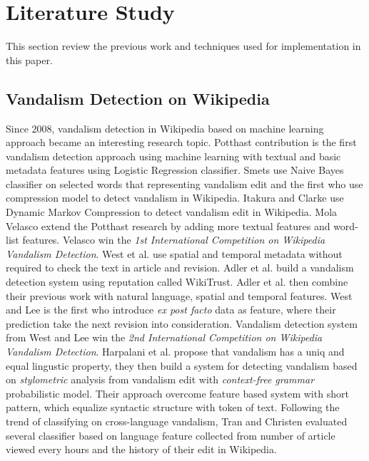 \documentclass[conference,compsoc,a4paper,twocolumn,final]{IEEEtran}
\begin{document}

\section{Literature Study}
\label{section:literature_study}

This section review the previous work and techniques used for implementation in
this paper.

\subsection{Vandalism Detection on Wikipedia}

Since 2008, vandalism detection in Wikipedia based on machine learning approach
became an interesting research topic.
Potthast \cite{potthast2008automatic} contribution is the first vandalism
detection approach using machine learning with textual and basic
metadata features using Logistic Regression classifier.
Smets \cite{smets08automaticvandalism} use Naive Bayes classifier on selected
words that representing vandalism edit and the first who use compression model
to detect vandalism in Wikipedia.
Itakura and Clarke \cite{itakura2009using} use Dynamic Markov Compression to
detect vandalism edit in Wikipedia.
Mola Velasco \cite{mola2012wikipedia} extend the Potthast research by adding
more textual features and word-list features.
Velasco win the \textit{1st International Competition on Wikipedia Vandalism
Detection}.
West et al. \cite{west2011multilingual} use spatial and temporal metadata
without required to check the text in article and revision.
Adler et al. \cite{adler2011wikipedia} build a vandalism detection system using
reputation called WikiTrust.
Adler et al. \cite{adler2011wikipedia} then combine their previous work with
natural language, spatial and temporal features.
West and Lee \cite{west2011multilingual} is the first who introduce
\textit{ex post facto} data as feature, where their prediction take the next
revision into consideration.
Vandalism detection system from West and Lee win the \textit{2nd International
Competition on Wikipedia Vandalism Detection}.
Harpalani et al. \cite{harpalani2011language} propose that vandalism has
a uniq and equal lingustic property, they then build a system for detecting
vandalism based on \textit{stylometric} analysis from vandalism edit with
\textit{context-free grammar} probabilistic model.
Their approach overcome feature based system with short pattern, which equalize
syntactic structure with token of text.
Following the trend of classifying on cross-language vandalism, Tran and
Christen \cite{tran2013cross} evaluated several classifier based on
language feature collected from number of article viewed every hours and the
history of their edit in Wikipedia.
\end{document}
